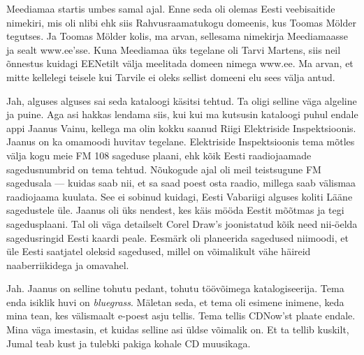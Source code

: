 
Meediamaa startis umbes samal ajal. Enne seda oli olemas  
Eesti veebisaitide nimekiri, mis oli nlibi ehk siis 
Rahvusraamatukogu domeenis, kus Toomas 
Mölder tegutses. Ja Toomas Mölder kolis, ma arvan, 
sellesama nimekirja Meediamaasse ja sealt www.ee'sse. Kuna 
Meediamaa üks tegelane oli Tarvi Martens, siis neil 
õnnestus kuidagi EENetilt välja meelitada domeen nimega 
www.ee. Ma arvan, et mitte kellelegi 
teisele kui Tarvile ei oleks sellist domeeni elu sees välja antud.


Jah, alguses alguses sai seda kataloogi käsitsi tehtud. Ta oligi selline väga 
algeline ja puine. Aga asi hakkas lendama siis, kui kui ma kutsusin kataloogi 
puhul endale appi Jaanus Vainu, kellega ma olin kokku 
saanud Riigi Elektriside Inspektsioonis. 
Jaanus on ka omamoodi huvitav tegelane. Elektriside Inspektsioonis tema mõtles 
välja kogu meie FM 108 sageduse plaani, ehk kõik Eesti raadiojaamade 
sagedusnumbrid on tema tehtud. Nõukogude ajal oli meil teistsugune FM 
sagedusala --- kuidas saab nii, et sa saad poest osta raadio, millega saab 
välismaa raadiojaama kuulata. See ei sobinud kuidagi, Eesti Vabariigi alguses 
koliti Lääne sagedustele üle. Jaanus oli üks nendest, kes käis mööda Eestit  
mõõtmas ja tegi sagedusplaani. Tal oli väga detailselt Corel Draw's joonistatud kõik need nii-öelda sagedusringid Eesti kaardi peale. Eesmärk 
oli  planeerida sagedused niimoodi, et üle Eesti saatjatel oleksid sagedused, 
millel on võimalikult vähe häireid naaberriikidega ja omavahel.  


Jah. Jaanus on selline tohutu pedant,  tohutu  töövõimega katalogiseerija. 
Tema enda isiklik huvi on \emph{bluegrass}. Mäletan seda, et tema oli esimene 
inimene, keda mina tean, kes välismaalt e-poest asju tellis.  Tema tellis 
CDNow'st  plaate endale. Mina väga imestasin, et kuidas selline asi üldse 
võimalik on. Et ta tellib kuskilt, Jumal teab kust ja tulebki pakiga kohale CD 
muusikaga.

